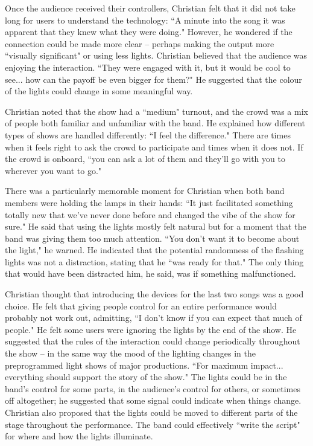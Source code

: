 Once the audience received their controllers, Christian felt that it did not take long for users to understand the technology: ``A minute into the song it was apparent that they knew what they were doing." However, he wondered if the connection could be made more clear -- perhaps making the output more ``visually significant" or using less lights. Christian believed that the audience was enjoying the interaction. ``They were engaged with it, but it would be cool to see... how can the payoff be even bigger for them?" He suggested that the colour of the lights could change in some meaningful way.

Christian noted that the show had a ``medium" turnout, and the crowd was a mix of people both familiar and unfamiliar with the band. He explained how different types of shows are handled differently: ``I feel the difference." There are times when it feels right to ask the crowd to participate and times when it does not. If the crowd is onboard, ``you can ask a lot of them and they'll go with you to wherever you want to go."

There was a particularly memorable moment for Christian when both band members were holding the lamps in their hands: ``It just facilitated something totally new that we've never done before and changed the vibe of the show for sure." He said that using the lights mostly felt natural but for a moment that the band was giving them too much attention. ``You don't want it to become about the light," he warned. He indicated that the potential randomness of the flashing lights was not a distraction, stating that he ``was ready for that." The only thing that would have been distracted him, he said, was if something malfunctioned.

Christian thought that introducing the devices for the last two songs was a good choice. He felt that giving people control for an entire performance would probably not work out, admitting, ``I don't know if you can expect that much of people." He felt some users were ignoring the lights by the end of the show. He suggested that the rules of the interaction could change periodically throughout the show -- in the same way the mood of the lighting changes in the preprogrammed light shows of major productions. ``For maximum impact... everything should support the story of the show." The lights could be in the band's control for some parts, in the audience's control for others, or sometimes off altogether; he suggested that some signal could indicate when things change. Christian also proposed that the lights could be moved to different parts of the stage throughout the performance. The band could effectively ``write the script" for where and how the lights illuminate.

